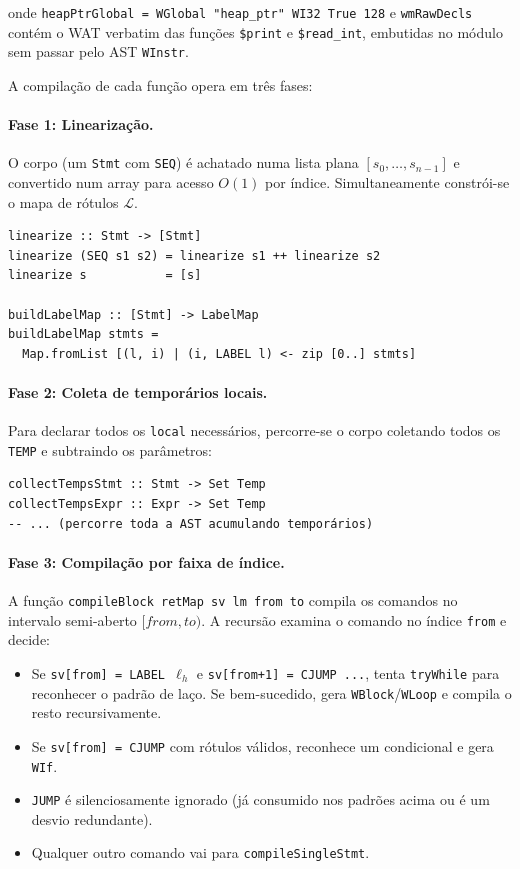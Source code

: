 \noindent onde \texttt{heapPtrGlobal = WGlobal "heap\_ptr" WI32 True 128} e
\texttt{wmRawDecls} contém o WAT verbatim das funções \texttt{\$print} e
\texttt{\$read\_int}, embutidas no módulo sem passar pelo AST \texttt{WInstr}.

A compilação de cada função opera em três fases:

\paragraph{Fase 1: Linearização.}
O corpo (um \texttt{Stmt} com \texttt{SEQ}) é achatado numa lista plana
$[s_0, \ldots, s_{n-1}]$ e convertido num array para acesso $O(1)$ por índice.
Simultaneamente constrói-se o mapa de rótulos $\mathcal{L}$.

\begin{verbatim}
linearize :: Stmt -> [Stmt]
linearize (SEQ s1 s2) = linearize s1 ++ linearize s2
linearize s           = [s]

buildLabelMap :: [Stmt] -> LabelMap
buildLabelMap stmts =
  Map.fromList [(l, i) | (i, LABEL l) <- zip [0..] stmts]
\end{verbatim}

\paragraph{Fase 2: Coleta de temporários locais.}
Para declarar todos os \texttt{local} necessários, percorre-se o corpo
coletando todos os \texttt{TEMP} e subtraindo os parâmetros:

\begin{verbatim}
collectTempsStmt :: Stmt -> Set Temp
collectTempsExpr :: Expr -> Set Temp
-- ... (percorre toda a AST acumulando temporários)
\end{verbatim}

\paragraph{Fase 3: Compilação por faixa de índice.}
A função \texttt{compileBlock retMap sv lm from to} compila os comandos no
intervalo semi-aberto $[\mathit{from}, \mathit{to})$.  A recursão examina o
comando no índice \texttt{from} e decide:

\begin{itemize}
  \item Se \texttt{sv[from] = LABEL $\ell_h$} e \texttt{sv[from+1] = CJUMP
    ...}, tenta \texttt{tryWhile} para reconhecer o padrão de laço.  Se
    bem-sucedido, gera \texttt{WBlock}/\texttt{WLoop} e compila o resto
    recursivamente.
  \item Se \texttt{sv[from] = CJUMP} com rótulos válidos, reconhece um
    condicional e gera \texttt{WIf}.
  \item \texttt{JUMP} é silenciosamente ignorado (já consumido nos padrões
    acima ou é um desvio redundante).
  \item Qualquer outro comando vai para \texttt{compileSingleStmt}.
\end{itemize}

